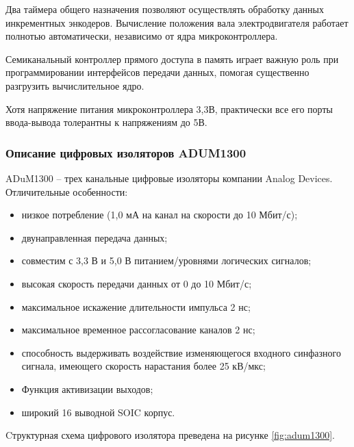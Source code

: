         Два таймера общего назначения позволяют осуществлять обработку данных
        инкрементных энкодеров. Вычисление положения вала электродвигателя
        работает полнотью автоматически, независимо от ядра микроконтроллера.

        Семиканальный контроллер прямого доступа в память играет важную роль при
        программировании интерфейсов передачи данных, помогая существенно разгрузить
        вычислительное ядро.

        Хотя напряжение питания микроконтроллера 3,3В, практически все его
        порты ввода-вывода толерантны к напряжениям до 5В.

    \subsubsection{Описание цифровых изоляторов ADUM1300}
        ADuM1300 – трех канальные цифровые изоляторы компании Analog Devices.
        Отличительные особенности:
        \begin{itemize}
            \item низкое потребление (1,0 мА на канал на скорости до 10
                Мбит/с);
            \item двунаправленная передача данных;
            \item совместим с 3,3 В и 5,0 В питанием/уровнями логических
                сигналов;
            \item высокая скорость передачи данных от 0 до 10 Мбит/с;
            \item максимальное искажение длительности импульса 2 нс;
            \item максимальное временное рассогласование каналов 2 нс;
            \item способность выдерживать воздействие изменяющегося входного
                синфазного сигнала, имеющего скорость нарастания более 25
                кВ/мкс;
            \item Функция активизации выходов;
            \item широкий 16 выводной SOIC корпус.
        \end{itemize}

        Cтруктурная схема цифрового изолятора преведена на рисунке \ref{fig:adum1300}.

